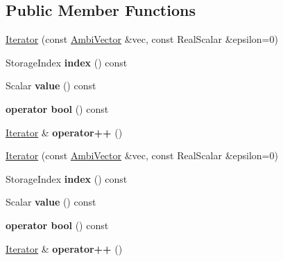 \subsection*{Public Member Functions}
\begin{DoxyCompactItemize}
\item 
\hyperlink{class_eigen_1_1internal_1_1_ambi_vector_1_1_iterator_a2201eecfa8e104d9f2017e47c5f24583}{Iterator} (const \hyperlink{class_eigen_1_1internal_1_1_ambi_vector}{Ambi\+Vector} \&vec, const Real\+Scalar \&epsilon=0)
\item 
\mbox{\label{class_eigen_1_1internal_1_1_ambi_vector_1_1_iterator_a60d302a0d837b10f02287c3de4f519ad}} 
Storage\+Index {\bfseries index} () const
\item 
\mbox{\label{class_eigen_1_1internal_1_1_ambi_vector_1_1_iterator_a7722c457498fd469be1e2adcc9c9c9fe}} 
Scalar {\bfseries value} () const
\item 
\mbox{\label{class_eigen_1_1internal_1_1_ambi_vector_1_1_iterator_a9a5264787033e4f7c46dba391a55e04d}} 
{\bfseries operator bool} () const
\item 
\mbox{\label{class_eigen_1_1internal_1_1_ambi_vector_1_1_iterator_a567260746471f2963051cf51ebe38860}} 
\hyperlink{class_eigen_1_1internal_1_1_ambi_vector_1_1_iterator}{Iterator} \& {\bfseries operator++} ()
\item 
\hyperlink{class_eigen_1_1internal_1_1_ambi_vector_1_1_iterator_a2201eecfa8e104d9f2017e47c5f24583}{Iterator} (const \hyperlink{class_eigen_1_1internal_1_1_ambi_vector}{Ambi\+Vector} \&vec, const Real\+Scalar \&epsilon=0)
\item 
\mbox{\label{class_eigen_1_1internal_1_1_ambi_vector_1_1_iterator_a60d302a0d837b10f02287c3de4f519ad}} 
Storage\+Index {\bfseries index} () const
\item 
\mbox{\label{class_eigen_1_1internal_1_1_ambi_vector_1_1_iterator_a7722c457498fd469be1e2adcc9c9c9fe}} 
Scalar {\bfseries value} () const
\item 
\mbox{\label{class_eigen_1_1internal_1_1_ambi_vector_1_1_iterator_a9a5264787033e4f7c46dba391a55e04d}} 
{\bfseries operator bool} () const
\item 
\mbox{\label{class_eigen_1_1internal_1_1_ambi_vector_1_1_iterator_a567260746471f2963051cf51ebe38860}} 
\hyperlink{class_eigen_1_1internal_1_1_ambi_vector_1_1_iterator}{Iterator} \& {\bfseries operator++} ()
\end{DoxyCompactItemize}
